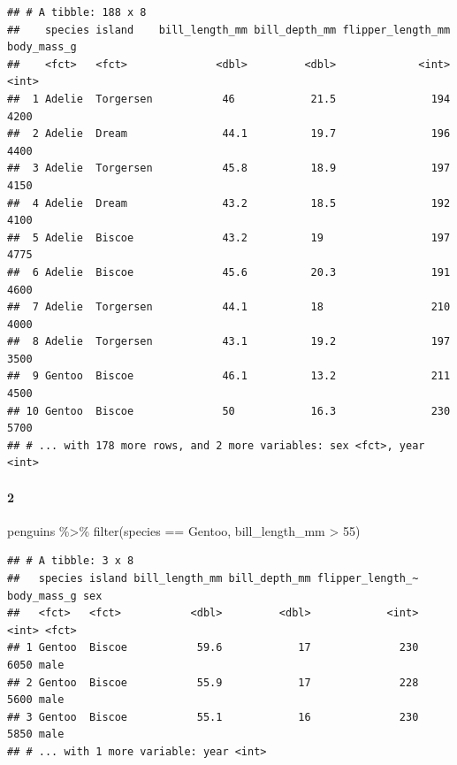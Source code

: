 \documentclass[
]{article}
\newenvironment{Shaded}{\begin{snugshade}}{\end{snugshade}}
\newcommand{\FunctionTok}[1]{\textcolor[rgb]{0.00,0.00,0.00}{#1}}
\newcommand{\NormalTok}[1]{#1}
\newcommand{\SpecialCharTok}[1]{\textcolor[rgb]{0.00,0.00,0.00}{#1}}
\newcommand{\StringTok}[1]{\textcolor[rgb]{0.31,0.60,0.02}{#1}}
\begin{document}
\begin{verbatim}
## # A tibble: 188 x 8
##    species island    bill_length_mm bill_depth_mm flipper_length_mm body_mass_g
##    <fct>   <fct>              <dbl>         <dbl>             <int>       <int>
##  1 Adelie  Torgersen           46            21.5               194        4200
##  2 Adelie  Dream               44.1          19.7               196        4400
##  3 Adelie  Torgersen           45.8          18.9               197        4150
##  4 Adelie  Dream               43.2          18.5               192        4100
##  5 Adelie  Biscoe              43.2          19                 197        4775
##  6 Adelie  Biscoe              45.6          20.3               191        4600
##  7 Adelie  Torgersen           44.1          18                 210        4000
##  8 Adelie  Torgersen           43.1          19.2               197        3500
##  9 Gentoo  Biscoe              46.1          13.2               211        4500
## 10 Gentoo  Biscoe              50            16.3               230        5700
## # ... with 178 more rows, and 2 more variables: sex <fct>, year <int>
\end{verbatim}

\hypertarget{section-1}{%
\paragraph{2}\label{section-1}}

\begin{Shaded}
\begin{Highlighting}[]
\NormalTok{penguins }\SpecialCharTok{\%\textgreater{}\%} 
  \FunctionTok{filter}\NormalTok{(species }\SpecialCharTok{==} \StringTok{\textquotesingle{}Gentoo\textquotesingle{}}\NormalTok{, }
\NormalTok{         bill\_length\_mm }\SpecialCharTok{\textgreater{}} \StringTok{\textquotesingle{}55\textquotesingle{}}\NormalTok{)}
\end{Highlighting}
\end{Shaded}

\begin{verbatim}
## # A tibble: 3 x 8
##   species island bill_length_mm bill_depth_mm flipper_length_~ body_mass_g sex  
##   <fct>   <fct>           <dbl>         <dbl>            <int>       <int> <fct>
## 1 Gentoo  Biscoe           59.6            17              230        6050 male 
## 2 Gentoo  Biscoe           55.9            17              228        5600 male 
## 3 Gentoo  Biscoe           55.1            16              230        5850 male 
## # ... with 1 more variable: year <int>
\end{verbatim}
\end{document}
